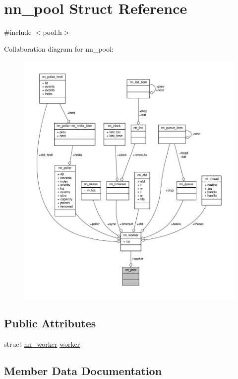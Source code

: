 \hypertarget{structnn__pool}{}\section{nn\+\_\+pool Struct Reference}
\label{structnn__pool}


{\ttfamily \#include $<$pool.\+h$>$}



Collaboration diagram for nn\+\_\+pool\+:\nopagebreak
\begin{figure}[H]
\begin{center}
\leavevmode
\includegraphics[width=350pt]{structnn__pool__coll__graph}
\end{center}
\end{figure}
\subsection*{Public Attributes}
\begin{DoxyCompactItemize}
\item 
struct \hyperlink{structnn__worker}{nn\+\_\+worker} \hyperlink{structnn__pool_a5e271d82592f7d332ae2de798bc1906b}{worker}
\end{DoxyCompactItemize}


\subsection{Member Data Documentation}

